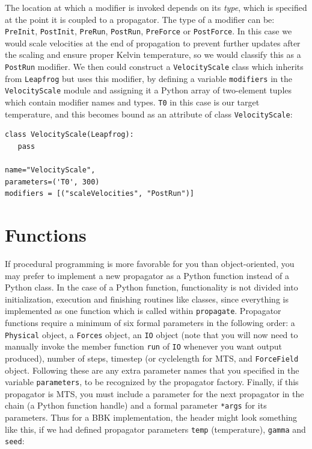 \documentclass[11pt]{report}
\begin{document}
The location at which a modifier is invoked depends on its 
{\it type}, which is specified at the point it is coupled to
a propagator.  The type of a modifier can be: \texttt{PreInit}, 
\texttt{PostInit}, \texttt{PreRun}, \texttt{PostRun}, 
\texttt{PreForce} or \texttt{PostForce}.  In this case we
would scale velocities at the end of propagation to prevent
further updates after the scaling and ensure proper Kelvin temperature,
so we would classify this as a \texttt{PostRun} modifier.
We then could construct a \texttt{VelocityScale} class which
inherits from \texttt{Leapfrog} but uses this modifier, by
defining a variable \texttt{modifiers} in the \texttt{VelocityScale}
module and assigning it a Python array of two-element tuples
which contain modifier names and types.  \texttt{T0} in this
case is our target temperature, and this becomes bound as
an attribute of class \texttt{VelocityScale}:


\begin{verbatim}
class VelocityScale(Leapfrog):
   pass

name="VelocityScale",
parameters=('T0', 300)
modifiers = [("scaleVelocities", "PostRun")]
\end{verbatim}


\section{Functions}

If procedural programming is more favorable for you than object-oriented,
you may prefer to implement a new propagator as a Python function instead
of a Python class.  In the case of a Python function, functionality
is not divided into initialization, execution and finishing routines like
classes, since everything is implemented as one function which is called
within \texttt{propagate}.  Propagator functions require a minimum of 
six formal parameters in the following order: a \texttt{Physical} object,
a \texttt{Forces} object, an \texttt{IO} object (note that you will
now need to manually invoke the member function \texttt{run} of \texttt{IO}
whenever you want output produced), number of steps, timestep (or cyclelength
for MTS, and \texttt{ForceField} object.  Following these are any extra parameter
names that you specified in the variable \texttt{parameters}, to be
recognized by the propagator factory.  Finally, if this propagator
is MTS, you must include a parameter for the next propagator in the 
chain (a Python function handle) and a formal parameter \texttt{*args}
for its parameters.  Thus for a BBK implementation, the header might
look something like this, if we had defined propagator parameters
\texttt{temp} (temperature), \texttt{gamma} and \texttt{seed}:
\end{document}
